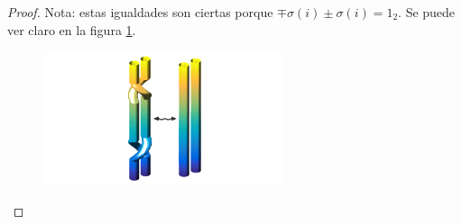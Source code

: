 \documentclass[14pt]{extarticle}
\begin{document}
\begin{pro}
\begin{proof}
		 Nota: estas igualdades son ciertas porque $\mp \sigma(i) \pm \sigma(i) = 1_{2}.$ Se puede ver claro en la figura \ref{demo1}.
	      	\begin{figure}[h!]
			\centering
			\includegraphics[width=7cm]{itrenzas/M1.png}
			\caption{}
			\label{demo1} 
			\end{figure}	     
				
	\end{proof}
\end{pro}
\end{document}
